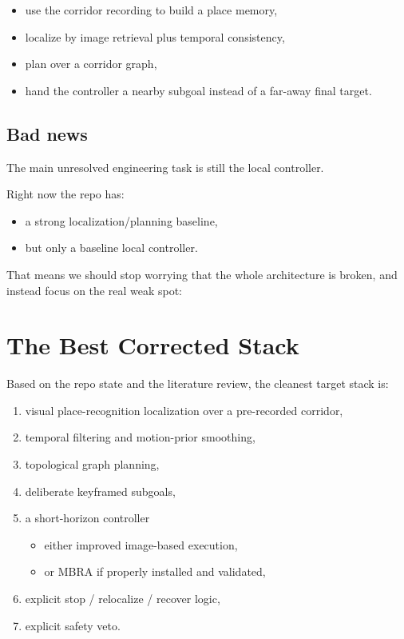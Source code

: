 \documentclass[11pt,a4paper]{article}
\begin{document}
\begin{itemize}[nosep]
  \item use the corridor recording to build a place memory,
  \item localize by image retrieval plus temporal consistency,
  \item plan over a corridor graph,
  \item hand the controller a nearby subgoal instead of a far-away final target.
\end{itemize}

\subsection{Bad news}

The main unresolved engineering task is still the local controller.

Right now the repo has:

\begin{itemize}[nosep]
  \item a strong localization/planning baseline,
  \item but only a baseline local controller.
\end{itemize}

That means we should stop worrying that the whole architecture is broken, and
instead focus on the real weak spot:

\begin{center}
\end{center}

\section{The Best Corrected Stack}

Based on the repo state and the literature review, the cleanest target stack is:

\begin{enumerate}[nosep]
  \item visual place-recognition localization over a pre-recorded corridor,
  \item temporal filtering and motion-prior smoothing,
  \item topological graph planning,
  \item deliberate keyframed subgoals,
  \item a short-horizon controller
    \begin{itemize}[nosep]
      \item either improved image-based execution,
      \item or MBRA if properly installed and validated,
    \end{itemize}
  \item explicit stop / relocalize / recover logic,
  \item explicit safety veto.
\end{enumerate}
\end{document}
